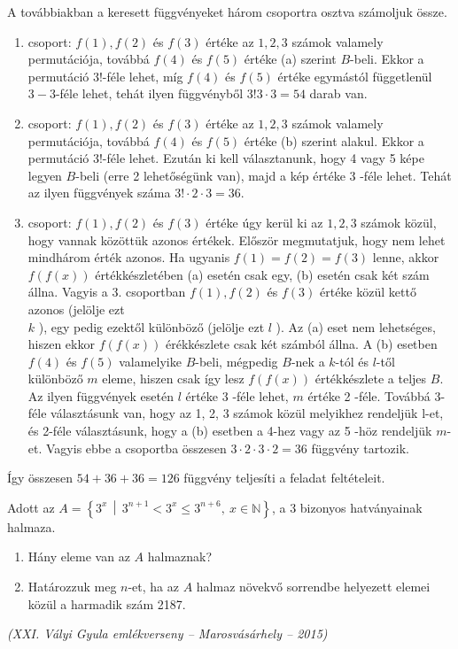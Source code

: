\begin{solution}
	A továbbiakban a keresett függvényeket három csoportra osztva számoljuk
	össze.
	\begin{enumerate}
		\item csoport: $f(1),f(2)$ és $f(3)$ értéke az $1,2,3$ számok valamely
		permutációja, továbbá $f(4)$ és $f(5)$ értéke (a) szerint $B$-beli.
		Ekkor a permutáció 3!-féle lehet, míg $f(4)$ és $f(5)$ értéke egymástól
		függetlenül $3-3$-féle lehet, tehát ilyen függvényből $3!3\cdot3=54$
		darab van. 
		\item csoport: $f(1),f(2)$ és $f(3)$ értéke az $1,2,3$ számok valamely
		permutációja, továbbá $f(4)$ és $f(5)$ értéke (b) szerint alakul.
		Ekkor a permutáció 3!-féle lehet. Ezután ki kell választanunk, hogy
		4 vagy 5 képe legyen $B$-beli (erre 2 lehetőségünk van), majd a kép
		értéke 3 -féle lehet. Tehát az ilyen függvények száma $3!\cdot2\cdot3=36$. 
		\item csoport: $f(1),f(2)$ és $f(3)$ értéke úgy kerül ki az $1,2,3$ számok
		közül, hogy vannak közöttük azonos értékek. Először megmutatjuk, hogy
		nem lehet mindhárom érték azonos. Ha ugyanis $f(1)=f(2)=f(3)$ lenne,
		akkor $f(f(x))$ értékkészletében (a) esetén csak egy, (b) esetén
		csak két szám állna. Vagyis a 3. csoportban $f(1),f(2)$ és $f(3)$
		értéke közül kettő azonos (jelölje ezt\\
		$k$ ), egy pedig ezektől különböző (jelölje ezt $l$ ). Az (a) eset
		nem lehetséges, hiszen ekkor $f(f(x))$ érékkészlete csak két számból
		állna. A (b) esetben $f(4)$ és $f(5)$ valamelyike $B$-beli, mégpedig
		$B$-nek a $k$-tól és $l$-től különböző $m$ eleme, hiszen csak
		így lesz $f(f(x))$ értékkészlete a teljes $B$. Az ilyen függvények
		esetén $l$ értéke 3 -féle lehet, $m$ értéke 2 -féle. Továbbá 3-féle
		választásunk van, hogy az 1, 2, 3 számok közül melyikhez rendeljük
		l-et, és 2-féle választásunk, hogy a (b) esetben a 4-hez vagy az 5
		-höz rendeljük $m$-et. Vagyis ebbe a csoportba összesen $3\cdot2\cdot3\cdot2=36$
		függvény tartozik. 
	\end{enumerate}
	Így összesen $54+36+36=126$ függvény teljesíti a feladat feltételeit. 
\end{solution}
\begin{extraproblem}
	Adott az $A=\left\{ 3^{x}\,\middle|\,3^{n+1}<3^{x}\leq3^{n+6},\ x\in\mathbb{N}\right\} $,
	a 3 bizonyos hatványainak halmaza.  
\begin{enumerate}
	\item Hány eleme van az $A$ halmaznak? 
	\item Határozzuk meg $n$-et, ha az $A$ halmaz növekvő sorrendbe helyezett
	elemei közül a harmadik szám 2187. 
\end{enumerate}
\textit{(XXI. Vályi Gyula emlékverseny -- Marosvásárhely -- 2015)}
\end{extraproblem}
